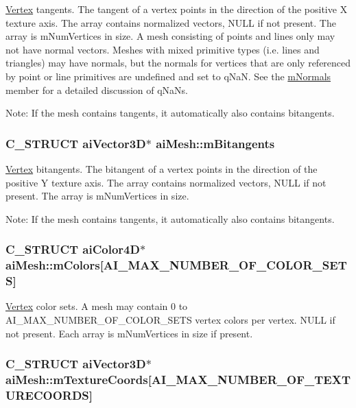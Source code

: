 \hyperlink{struct_vertex}{Vertex} tangents. The tangent of a vertex points in the direction of the positive X texture axis. The array contains normalized vectors, NULL if not present. The array is mNumVertices in size. A mesh consisting of points and lines only may not have normal vectors. Meshes with mixed primitive types (i.e. lines and triangles) may have normals, but the normals for vertices that are only referenced by point or line primitives are undefined and set to qNaN. See the \hyperlink{structai_mesh_ec81b496b4d93838cef038933dabe9b9}{mNormals} member for a detailed discussion of qNaNs. \begin{Desc}
\item[Note:]If the mesh contains tangents, it automatically also contains bitangents. \end{Desc}
\hypertarget{structai_mesh_b2a81bfe1731f01271ebab274a8f01c4}{
\subsubsection[mBitangents]{\setlength{\rightskip}{0pt plus 5cm}C\_\-STRUCT aiVector3D$\ast$ {\bf aiMesh::mBitangents}}}
\label{structai_mesh_b2a81bfe1731f01271ebab274a8f01c4}


\hyperlink{struct_vertex}{Vertex} bitangents. The bitangent of a vertex points in the direction of the positive Y texture axis. The array contains normalized vectors, NULL if not present. The array is mNumVertices in size. \begin{Desc}
\item[Note:]If the mesh contains tangents, it automatically also contains bitangents. \end{Desc}
\hypertarget{structai_mesh_d9215f67bd0c2277b10775a8adb66b96}{
\subsubsection[mColors]{\setlength{\rightskip}{0pt plus 5cm}C\_\-STRUCT aiColor4D$\ast$ {\bf aiMesh::mColors}\mbox{[}AI\_\-MAX\_\-NUMBER\_\-OF\_\-COLOR\_\-SETS\mbox{]}}}
\label{structai_mesh_d9215f67bd0c2277b10775a8adb66b96}


\hyperlink{struct_vertex}{Vertex} color sets. A mesh may contain 0 to AI\_\-MAX\_\-NUMBER\_\-OF\_\-COLOR\_\-SETS vertex colors per vertex. NULL if not present. Each array is mNumVertices in size if present. \hypertarget{structai_mesh_4a50b11d00ef50f419c75cab0f6bddd6}{
\subsubsection[mTextureCoords]{\setlength{\rightskip}{0pt plus 5cm}C\_\-STRUCT aiVector3D$\ast$ {\bf aiMesh::mTextureCoords}\mbox{[}AI\_\-MAX\_\-NUMBER\_\-OF\_\-TEXTURECOORDS\mbox{]}}}
\label{structai_mesh_4a50b11d00ef50f419c75cab0f6bddd6}


